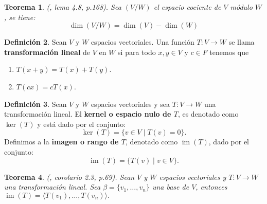 \documentclass[12pt]{book}
\newtheorem{theorem}{Teorema}[section]
\theoremstyle{definition}
\newtheorem{definition}[theorem]{Definición}
\DeclareMathOperator{\im}{im}
\newcounter{in}
\newcounter{ini}
\begin{document}
\begin{theorem}{\normalfont (\cite{herstein1990algebra}, lema 4.8, p.168)}.
  \label{dim-esp-coc}
  Sea $(V/W)$ el espacio cociente de $V$ módulo $W$, se tiene:
  $$\dim(V/W)=\dim(V)-\dim(W)$$
\end{theorem}


\begin{definition}
  \label{t-l}
  Sean $V$ y $W$ espacios vectoriales. Una función
  $T:V\rightarrow W$ se llama \textbf{transformación lineal} de $V$ en
  $W$ si para todo $x,y\in V$ y $c\in F$ tenemos que
  \begin{enumerate}
  \item $T(x+y)=T(x)+T(y)$.
  \item $T(cx)=cT(x)$.
  \end{enumerate}
\end{definition}

\begin{definition}
  \label{ker-im}
  Sean $V$ y $W$ espacios vectoriales y sea $T:V\rightarrow W$ una
  transformación lineal. El \textbf{kernel o espacio nulo de $T$},
  es denotado como $\ker(T)$ y está dado por el conjunto:
  \begin{equation*}
    \ker(T)=\{v\in V\mid T(v)=0\}.
  \end{equation*}
  Definimos a la \textbf{imagen o rango de $T$}, denotado como
  $\im(T)$, dado por el conjunto:
  \begin{equation*}
    \im (T)=\{T(v)\mid v\in V\}.
  \end{equation*}
\end{definition}

\begin{theorem}{\normalfont (\cite{friedberg1982algebra}, corolario 2.3, p.69)}.
  \label{imT}
  Sean $V$ y $W$ espacios vectoriales y $T:V \rightarrow W$
  una transformación lineal. Sea $\beta=\{v_{1},\ldots,v_{n}\}$ una base de $V$,
  entonces $\im(T)=\langle T(v_{1}),\ldots,T(v_{n})\rangle.$  
\end{theorem}
\end{document}
